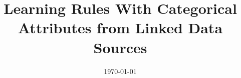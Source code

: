 \documentclass[a4paper, 11pt, twoside, openright]{Thesis}  %
\begin{document}
\frontmatter	  %

\title  {Learning Rules With Categorical Attributes from Linked Data Sources}
\author{\authornames}
\addresses  {\groupname\\\deptname\\\univname}  %
\date       {\today}
\subject    {}
\keywords   {}

\maketitle



\pagestyle{fancy}  %
\fancyhead[RE,LO]{\sffamily\bfseries\nouppercase{\rightmark}}
\fancyhead[LE,RO]{\thepage}

\pagestyle{empty}  %



\pagestyle{empty}


\pagestyle{empty}


\pagestyle{fancy}  %
\end{document}

